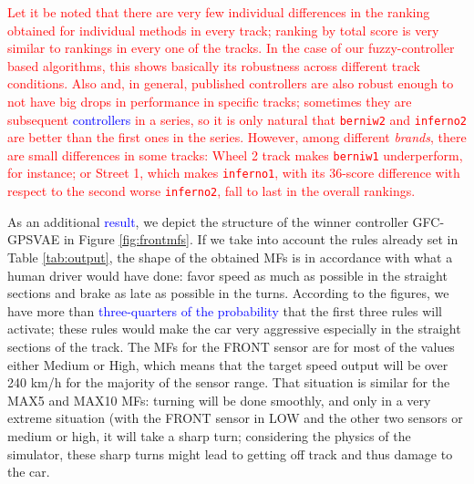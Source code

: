 \documentclass[10pt,journal,compsoc]{IEEEtran}
\begin{document}
\textcolor{red}{Let it be noted that there are very few individual
  differences in the ranking obtained for individual methods in every
  track; ranking by total score is very similar to rankings in every
  one of the tracks. In the case of our fuzzy-controller based
  algorithms, this shows basically its robustness across different
  track conditions. Also and, in general, published controllers are also robust
  enough to not have big drops in performance in specific
  tracks; sometimes they are subsequent \textcolor{blue}{controllers} in a series, so
  it is only natural that {\tt berniw2} and {\tt inferno2} are better
  than the first ones in the series. However, among different {\em
    brands}, there are small differences in some tracks: {\sf
    Wheel 2} track makes {\tt berniw1} underperform, for instance; or
  {\sf Street 1}, which makes {\tt inferno1}, with its 36-score
  difference with respect to the second worse {\tt inferno2}, fall to
  last in the overall rankings.}


As an additional \textcolor{blue}{result}, we depict the structure of the winner controller {\sf GFC-GPSVAE} in Figure \ref{fig:frontmfs}. 
If we take into account the rules already set in Table
\ref{tab:output}, the shape of the obtained MFs  is in accordance with
what a human driver would have done: favor speed as much as possible
in the straight sections and brake as late as possible in the turns. 
According to the figures, we have more than \textcolor{blue}{three-quarters of the probability} that the first three rules will activate; these rules
would make the car very aggressive especially in the straight sections
of the track. The MFs for the FRONT sensor are for most of the values
either Medium or High, which means that the target speed output will
be over 240 km/h for the majority of the sensor range. 
That situation is similar for the MAX5 and MAX10 MFs: turning will be done smoothly, and only in a very extreme situation (with the FRONT sensor in LOW and
the other two sensors or medium or high, it will take a sharp turn;
considering the physics of the simulator, these sharp turns might lead
to getting off track and thus damage to the car.
\end{document}

